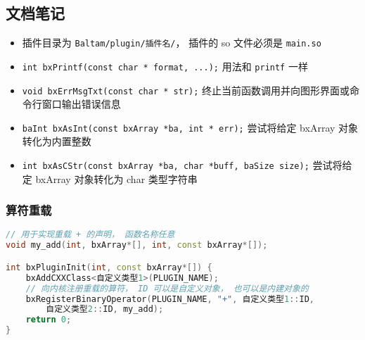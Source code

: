 \subsection{文档笔记}
\begin{itemize}
\item 插件目录为 \verb|Baltam/plugin/插件名/|， 插件的 so 文件必须是 \verb|main.so|
\item \verb|int bxPrintf(const char * format, ...);| 用法和 \verb|printf| 一样
\item \verb|void bxErrMsgTxt(const char * str);| 终止当前函数调用并向图形界面或命令行窗口输出错误信息
\item \verb|baInt bxAsInt(const bxArray *ba, int * err);| 尝试将给定 bxArray 对象转化为内置整数
\item \verb|int bxAsCStr(const bxArray *ba, char *buff, baSize size);| 尝试将给定 bxArray 对象转化为 char 类型字符串
\end{itemize}

\subsubsection{算符重载}
\begin{lstlisting}[language=cpp]
// 用于实现重载 + 的声明， 函数名称任意
void my_add(int, bxArray*[], int, const bxArray*[]);

int bxPluginInit(int, const bxArray*[]) {
    bxAddCXXClass<自定义类型1>(PLUGIN_NAME);
    // 向内核注册重载的算符， ID 可以是自定义对象， 也可以是内建对象的
    bxRegisterBinaryOperator(PLUGIN_NAME, "+", 自定义类型1::ID,
        自定义类型2::ID, my_add);
    return 0;
}
\end{lstlisting}
